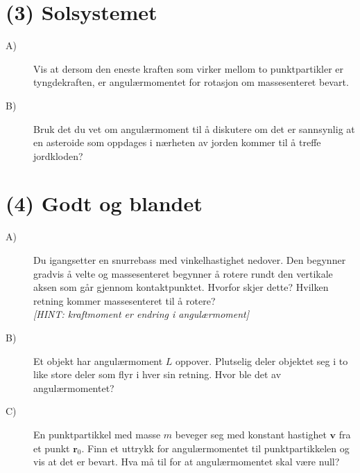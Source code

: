 \documentclass[twoside,utf8]{article}
\begin{document}
\section*{(3) Solsystemet}
\begin{description}
  \item[A)] Vis at dersom den eneste kraften som virker mellom to punktpartikler er tyngdekraften, er angulærmomentet for rotasjon om massesenteret bevart.

  \item[B)] Bruk det du vet om angulærmoment til å diskutere om det er sannsynlig at en asteroide som oppdages i nærheten av jorden kommer til å treffe jordkloden?
\end{description}


\section*{(4) Godt og blandet}
\begin{description}
  \item[A)] Du igangsetter en snurrebass med vinkelhastighet nedover. Den begynner gradvis å velte og massesenteret begynner å rotere rundt den vertikale aksen som går gjennom kontaktpunktet. Hvorfor skjer dette? Hvilken retning kommer massesenteret til å rotere? \\
  {\it [HINT: kraftmoment er endring i angulærmoment]}

  \item[B)] Et objekt har angulærmoment $L$ oppover. Plutselig deler objektet seg i to like store deler som flyr i hver sin retning. Hvor ble det av angulærmomentet?

  \item[C)] En punktpartikkel med masse $m$ beveger seg med konstant hastighet $\mathbf{v}$ fra et punkt $\mathbf{r}_0$. Finn et uttrykk for angulærmomentet til punktpartikkelen og vis at det er bevart. Hva må til for at angulærmomentet skal være null?

\end{description}
\end{document}
